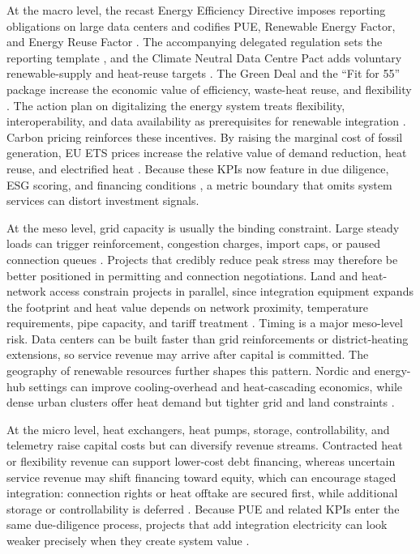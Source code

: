 \documentclass[preprint,12pt]{elsarticle}
\begin{document}
At the macro level, the recast Energy Efficiency Directive imposes reporting obligations on large data centers and codifies PUE, Renewable Energy Factor, and Energy Reuse Factor \cite{15}. The accompanying delegated regulation sets the reporting template \cite{EUDataCenterDirective2023}, and the Climate Neutral Data Centre Pact adds voluntary renewable-supply and heat-reuse targets \cite{16}. The Green Deal and the ``Fit for 55'' package increase the economic value of efficiency, waste-heat reuse, and flexibility \cite{17,7}. The action plan on digitalizing the energy system treats flexibility, interoperability, and data availability as prerequisites for renewable integration \cite{8}. Carbon pricing reinforces these incentives. By raising the marginal cost of fossil generation, EU ETS prices increase the relative value of demand reduction, heat reuse, and electrified heat \cite{7}. Because these KPIs now feature in due diligence, ESG scoring, and financing conditions \cite{EUDataCenterDirective2023}, a metric boundary that omits system services can distort investment signals.

At the meso level, grid capacity is usually the binding constraint. Large steady loads can trigger reinforcement, congestion charges, import caps, or paused connection queues \cite{6,21}. Projects that credibly reduce peak stress may therefore be better positioned in permitting and connection negotiations. Land and heat-network access constrain projects in parallel, since integration equipment expands the footprint and heat value depends on network proximity, temperature requirements, pipe capacity, and tariff treatment \cite{11,23}. Timing is a major meso-level risk. Data centers can be built faster than grid reinforcements or district-heating extensions, so service revenue may arrive after capital is committed. The geography of renewable resources further shapes this pattern. Nordic and energy-hub settings can improve cooling-overhead and heat-cascading economics, while dense urban clusters offer heat demand but tighter grid and land constraints \cite{24,25}.

At the micro level, heat exchangers, heat pumps, storage, controllability, and telemetry raise capital costs but can diversify revenue streams. Contracted heat or flexibility revenue can support lower-cost debt financing, whereas uncertain service revenue may shift financing toward equity, which can encourage staged integration: connection rights or heat offtake are secured first, while additional storage or controllability is deferred \cite{23,12}. Because PUE and related KPIs enter the same due-diligence process, projects that add integration electricity can look weaker precisely when they create system value \cite{Belady2008PUE,VandeVoort2017}.
\end{document}
